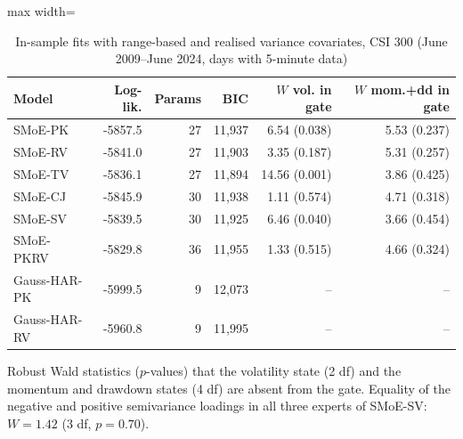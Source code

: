 \begin{table}[!htbp]\centering\small
\caption{In-sample fits with range-based and realised variance covariates, CSI 300 (June 2009--June 2024, days with 5-minute data)}\label{tab:rv-insample}
\begin{adjustbox}{max width=\textwidth}
\begin{tabular}{lrrrrr}
\toprule
Model & Log-lik. & Params & BIC & $W$ vol. in gate & $W$ mom.+dd in gate\\
\midrule
SMoE-PK & -5857.5 & 27 & 11,937 & 6.54 (0.038) & 5.53 (0.237)\\
SMoE-RV & -5841.0 & 27 & 11,903 & 3.35 (0.187) & 5.31 (0.257)\\
SMoE-TV & -5836.1 & 27 & 11,894 & 14.56 (0.001) & 3.86 (0.425)\\
SMoE-CJ & -5845.9 & 30 & 11,938 & 1.11 (0.574) & 4.71 (0.318)\\
SMoE-SV & -5839.5 & 30 & 11,925 & 6.46 (0.040) & 3.66 (0.454)\\
SMoE-PKRV & -5829.8 & 36 & 11,955 & 1.33 (0.515) & 4.66 (0.324)\\
Gauss-HAR-PK & -5999.5 & 9 & 12,073 & -- & --\\
Gauss-HAR-RV & -5960.8 & 9 & 11,995 & -- & --\\
\bottomrule
\end{tabular}
\end{adjustbox}
\par\smallskip\begin{minipage}{\textwidth}\footnotesize
Robust Wald statistics ($p$-values) that the volatility state (2 df) and the momentum and drawdown states (4 df) are absent from the gate. Equality of the negative and positive semivariance loadings in all three experts of SMoE-SV: $W=1.42$ (3 df, $p=0.70$).
\end{minipage}
\end{table}